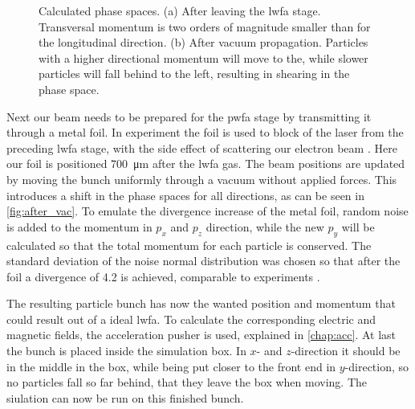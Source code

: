 \documentclass[bachelor_thesis]{subfiles}
\begin{document}
\begin{figure}
\begin{subfigure}{\textwidth}
	\missingfigure{}
	\label{fig:after_lwfa}
\end{subfigure}
\newline
\begin{subfigure}{\textwidth}
	\missingfigure{}
	\label{fig:after_vac}
\end{subfigure}

\caption{Calculated phase spaces. (a) After leaving the \gls{lwfa} stage. Transversal momentum is two orders of magnitude smaller than for the longitudinal direction. (b) After vacuum propagation. Particles with
a higher directional momentum will move to the, while slower particles will fall behind to the left, resulting in shearing in the phase space.}
\end{figure}

Next our beam needs to be prepared for the \gls{pwfa} stage by transmitting it through a metal foil. In experiment the foil is used to block of the laser from the preceding \gls{lwfa} stage, 
with the side effect of scattering our electron beam \cite{Raj2020}. Here our foil is positioned \qty{700}{\um} after the \gls{lwfa} gas.
The beam positions are updated by moving the bunch uniformly through a vacuum without applied forces. This introduces a shift in the phase spaces for all directions, as can be seen in \autoref{fig:after_vac}.
To emulate the divergence increase of the metal foil, random noise is added to the momentum in $p_x$ and $p_z$ direction, while the new $p_y$ will be calculated so that the total momentum for each particle is conserved.
The standard deviation of the noise normal distribution was chosen so that after the foil a divergence of \qty{4.2}{\mrad} is achieved, comparable to experiments \cite{Schoebel2022}.

The resulting particle bunch has now the wanted position and momentum that could result out of a ideal \gls{lwfa}. To calculate the corresponding electric and magnetic fields, the acceleration pusher is used, explained in \autoref{chap:acc}.
At last the bunch is placed inside the simulation box. In $x$- and $z$-direction it should be in the middle in the box, while being put closer to the front end in $y$-direction, so no particles fall so far behind, that they leave the box when moving.
The siulation can now be run on this finished bunch.
\end{document}
